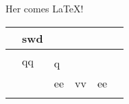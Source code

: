 \documentclass{article}
\begin{document}
Her comes \LaTeX!


					
					



\begin{table}[]
	\begin{tabular}{|l|l|l|l|l|l|}
		\hline
		& swd                 &    &    &    &  \\ \hline
		& \multirow{2}{*}{qq} &    &    &    &  \\ \cline{1-1} \cline{3-6} 
		&                     & q  &    &    &  \\ \hline
		&                     & ee & vv & ee &  \\ \hline
		&                     &    &    &    &  \\ \hline
	\end{tabular}
\end{table}
\end{document}

